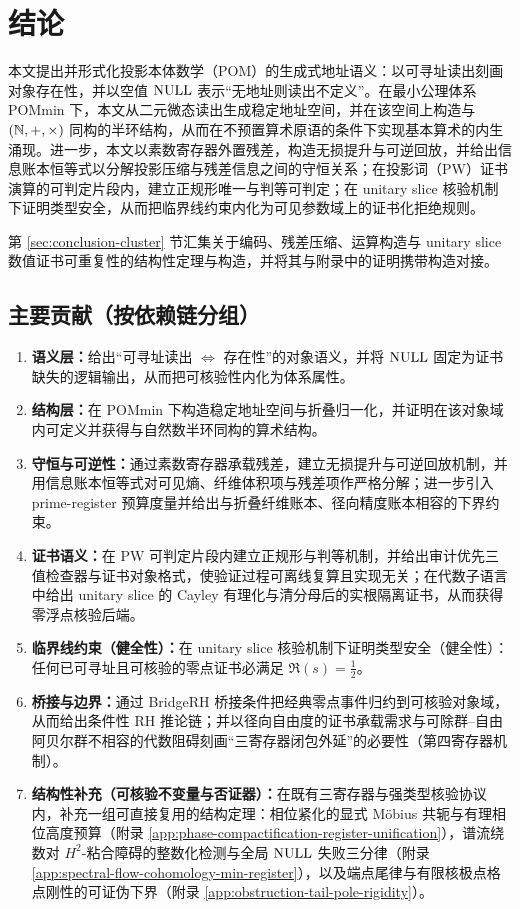 \section{结论}

本文提出并形式化投影本体数学（POM）的生成式地址语义：以可寻址读出刻画对象存在性，并以空值 $\mathrm{NULL}$ 表示“无地址则读出不定义”。在最小公理体系 POMmin 下，本文从二元微态读出生成稳定地址空间，并在该空间上构造与 $(\mathbb{N},+,\times)$ 同构的半环结构，从而在不预置算术原语的条件下实现基本算术的内生涌现。进一步，本文以素数寄存器外置残差，构造无损提升与可逆回放，并给出信息账本恒等式以分解投影压缩与残差信息之间的守恒关系；在投影词（PW）证书演算的可判定片段内，建立正规形唯一与判等可判定；在 unitary slice 核验机制下证明类型安全，从而把临界线约束内化为可见参数域上的证书化拒绝规则。

第 \ref{sec:conclusion-cluster} 节汇集关于编码、残差压缩、运算构造与 unitary slice 数值证书可重复性的结构性定理与构造，并将其与附录中的证明携带构造对接。

\subsection{主要贡献（按依赖链分组）}
\begin{enumerate}
  \item \textbf{语义层：}给出“可寻址读出 $\Leftrightarrow$ 存在性”的对象语义，并将 $\mathrm{NULL}$ 固定为证书缺失的逻辑输出，从而把可核验性内化为体系属性。
  \item \textbf{结构层：}在 POMmin 下构造稳定地址空间与折叠归一化，并证明在该对象域内可定义并获得与自然数半环同构的算术结构。
  \item \textbf{守恒与可逆性：}通过素数寄存器承载残差，建立无损提升与可逆回放机制，并用信息账本恒等式对可见熵、纤维体积项与残差项作严格分解；进一步引入 prime-register 预算度量并给出与折叠纤维账本、径向精度账本相容的下界约束。
  \item \textbf{证书语义：}在 PW 可判定片段内建立正规形与判等机制，并给出审计优先三值检查器与证书对象格式，使验证过程可离线复算且实现无关；在代数子语言中给出 unitary slice 的 Cayley 有理化与清分母后的实根隔离证书，从而获得零浮点核验后端。
  \item \textbf{临界线约束（健全性）：}在 unitary slice 核验机制下证明类型安全（健全性）：任何已可寻址且可核验的零点证书必满足 $\Re(s)=\tfrac12$。
  \item \textbf{桥接与边界：}通过 BridgeRH 桥接条件把经典零点事件归约到可核验对象域，从而给出条件性 RH 推论链；并以径向自由度的证书承载需求与可除群--自由阿贝尔群不相容的代数阻碍刻画“三寄存器闭包外延”的必要性（第四寄存器机制）。
  \item \textbf{结构性补充（可核验不变量与否证器）：}在既有三寄存器与强类型核验协议内，补充一组可直接复用的结构定理：相位紧化的显式 Möbius 共轭与有理相位高度预算（附录 \ref{app:phase-compactification-register-unification}），谱流绕数对 $H^2$-粘合障碍的整数化检测与全局 $\mathrm{NULL}$ 失败三分律（附录 \ref{app:spectral-flow-cohomology-min-register}），以及端点尾律与有限核极点格点刚性的可证伪下界（附录 \ref{app:obstruction-tail-pole-rigidity}）。
\end{enumerate}


